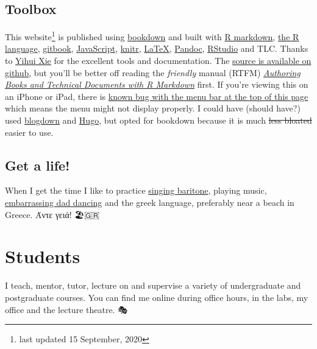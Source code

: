 \documentclass[
  12pt,
]{book}
\begin{document}
\hypertarget{toolbox}{%
\section*{Toolbox}\label{toolbox}}

This website\footnote{last updated 15 September, 2020} is published using \href{https://bookdown.org}{bookdown} and built with \href{https://rmarkdown.rstudio.com/}{R markdown}, \href{https://en.wikipedia.org/wiki/R_(programming_language)}{the R language}, \href{https://www.gitbook.com}{gitbook}, \href{https://en.wikipedia.org/wiki/JavaScript}{JavaScript}, \href{https://en.wikipedia.org/wiki/Knitr}{knitr}, \href{https://en.wikipedia.org/wiki/LaTeX}{LaTeX}, \href{https://pandoc.org/}{Pandoc}, \href{https://www.rstudio.com/}{RStudio} and TLC. Thanks to \href{https://yihui.name/}{Yihui Xie} for the excellent tools and documentation. The \href{https://github.com/dullhunk/hulled}{source is available on github}, but you'll be better off reading the \emph{friendly} manual (RTFM) \emph{\href{https://bookdown.org/yihui/bookdown/}{Authoring Books and Technical Documents with R Markdown}} first. If you're viewing this on an iPhone or iPad, there is \href{https://github.com/rstudio/bookdown/issues/60}{known bug with the menu bar at the top of this page} which means the menu might not display properly. I could have (should have?) used \href{https://bookdown.org/yihui/blogdown/}{blogdown} and \href{https://gohugo.io}{Hugo}, but opted for bookdown because it is much \sout{less bloated} easier to use. 🔨

\hypertarget{get-a-life}{%
\section*{Get a life!}\label{get-a-life}}

When I get the time I like to practice \href{https://en.wikipedia.org/wiki/Baritone}{singing baritone}, playing music, \protect\hyperlink{tuningcomplete}{embarrassing dad dancing} and the greek language, preferably near a beach in Greece. Άντε γειά! 🏖️🇬🇷

\hypertarget{teaching}{%
\chapter{Students}\label{teaching}}

I teach, mentor, tutor, lecture on and supervise a variety of undergraduate and postgraduate courses. You can find me online during office hours, in the labs, my office and the lecture theatre. 🎭
\end{document}
